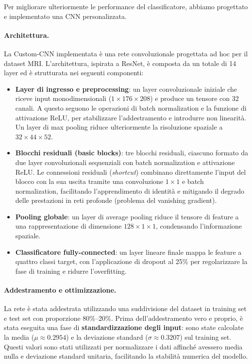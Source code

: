 Per migliorare ulteriormente le performance del classificatore, abbiamo progettato e implementato una CNN personalizzata. 

\paragraph{Architettura.}
La Custom-CNN implementata è una rete convoluzionale progettata ad hoc per il dataset MRI. L’architettura, ispirata a ResNet, è composta da un totale di 14 layer ed è strutturata nei seguenti componenti:

\begin{itemize}
    \item \textbf{Layer di ingresso e preprocessing}: un layer convoluzionale iniziale che riceve input monodimensionali ($1 \times 176 \times 208$) e produce un tensore con 32 canali. A questo seguono le operazioni di batch normalization e la funzione di attivazione ReLU, per stabilizzare l’addestramento e introdurre non linearità. Un layer di max pooling riduce ulteriormente la risoluzione spaziale a $32 \times 44 \times 52$.

    \item \textbf{Blocchi residuali (basic blocks)}: tre blocchi residuali, ciascuno formato da due layer convoluzionali sequenziali con batch normalization e attivazione ReLU. Le connessioni residuali (\emph{shortcut}) combinano direttamente l’input del blocco con la sua uscita tramite una convoluzione $1\times 1$ e batch normalization, facilitando l’apprendimento di identità e mitigando il degrado delle prestazioni in reti profonde (problema del vanishing gradient).

    \item \textbf{Pooling globale}: un layer di average pooling riduce il tensore di feature a una rappresentazione di dimensione $128\times 1\times 1$, condensando l’informazione spaziale.

    \item \textbf{Classificatore fully-connected}: un layer lineare finale mappa le feature a quattro classi target, con l’applicazione di dropout al 25\% per regolarizzare la fase di training e ridurre l’overfitting.
\end{itemize}


\paragraph{Addestramento e ottimizzazione.}
La rete è stata addestrata utilizzando una suddivisione del dataset in training set e test set con proporzione 80\%--20\%. 
Prima dell'addestramento vero e proprio, è stata eseguita una fase di \textbf{standardizzazione degli input}: sono state calcolate la media ($\mu \approx 0.2954$) e la deviazione standard ($\sigma \approx 0.3207$) sul training set. Questi valori sono stati utilizzati per normalizzare i dati affinché avessero media nulla e deviazione standard unitaria, facilitando la stabilità numerica del modello.



